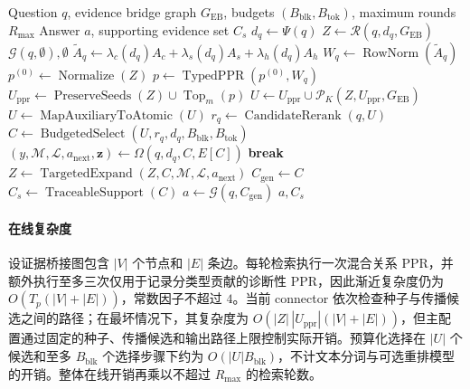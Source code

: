 \begin{algorithm*}[t]
\caption{EviBridge-RAG Evidence Bridging and Sufficiency Control}
\label{alg:evibridge}
\small
\begin{algorithmic}[1]
\Require Question $q$, evidence bridge graph $G_{\mathrm{EB}}$, budgets $(B_{\mathrm{blk}},B_{\mathrm{tok}})$, maximum rounds $R_{\max}$
\Ensure Answer $a$, supporting evidence set $C_s$
\State $d_q \gets \Psi(q)$
\State $Z \gets \mathcal{R}(q,d_q,G_{\mathrm{EB}})$
    \State \Return $\mathcal{G}(q,\emptyset),\emptyset$
\EndIf
{}
    \State $\widetilde{A}_q \gets \lambda_c(d_q)A_c+\lambda_s(d_q)A_s+\lambda_h(d_q)A_h$
    \State $W_q \gets \operatorname{RowNorm}(\widetilde{A}_q)$
    \State $p^{(0)} \gets \operatorname{Normalize}(Z)$
    \State $p \gets \operatorname{TypedPPR}(p^{(0)},W_q)$
    \State $U_{\mathrm{ppr}} \gets \operatorname{PreserveSeeds}(Z)\cup\operatorname{Top}_m(p)$
    \State $U \gets U_{\mathrm{ppr}}\cup\mathcal{P}_K(Z,U_{\mathrm{ppr}},G_{\mathrm{EB}})$
    \State $U \gets \operatorname{MapAuxiliaryToAtomic}(U)$
    \State $r_q \gets \operatorname{CandidateRerank}(q,U)$
    \State $C \gets \operatorname{BudgetedSelect}(U,r_q,d_q,B_{\mathrm{blk}},B_{\mathrm{tok}})$
    \State $(y,\mathcal{M},\mathcal{L},a_{\mathrm{next}},\mathbf{z})
        \gets \Omega(q,d_q,C,E[C])$
        \State \textbf{break}
    \EndIf
    \State $Z \gets \operatorname{TargetedExpand}(Z,C,\mathcal{M},\mathcal{L},a_{\mathrm{next}})$
\EndFor
\State $C_{\mathrm{gen}}\gets C$
\State $C_s\gets\operatorname{TraceableSupport}(C)$
\State $a\gets\mathcal{G}(q,C_{\mathrm{gen}})$
\State \Return $a,C_s$
\end{algorithmic}
\end{algorithm*}

\paragraph{在线复杂度}
设证据桥接图包含 $|V|$ 个节点和 $|E|$ 条边。每轮检索执行一次混合关系 PPR，并额外执行至多三次仅用于记录分类型贡献的诊断性 PPR，因此渐近复杂度仍为 $O(T_p(|V|+|E|))$，常数因子不超过 $4$。当前 connector 依次检查种子与传播候选之间的路径；在最坏情况下，其复杂度为 $O(|Z|\,|U_{\mathrm{ppr}}|(|V|+|E|))$，但主配置通过固定的种子、传播候选和输出路径上限控制实际开销。预算化选择在 $|U|$ 个候选和至多 $B_{\mathrm{blk}}$ 个选择步骤下约为 $O(|U|B_{\mathrm{blk}})$，不计文本分词与可选重排模型的开销。整体在线开销再乘以不超过 $R_{\max}$ 的检索轮数。
